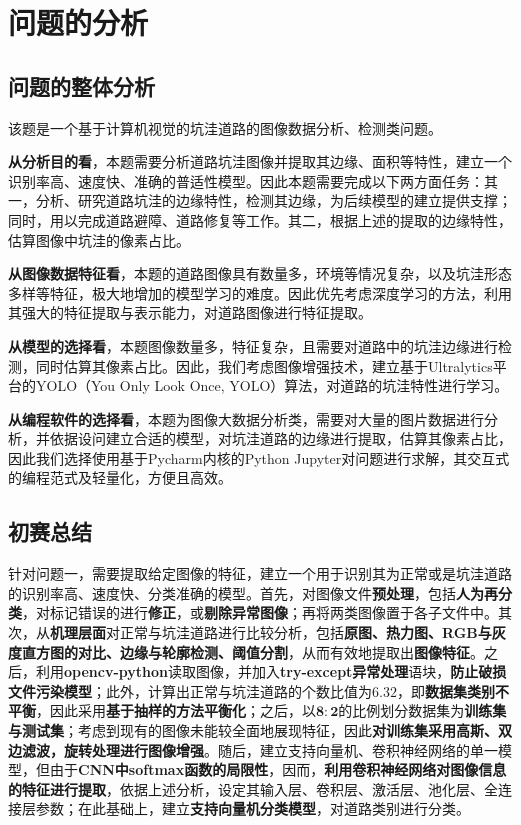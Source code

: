 \documentclass{MathorCupmodeling}
\begin{document}
	\section{问题的分析}
	\subsection{问题的整体分析}
	该题是一个基于计算机视觉的坑洼道路的图像数据分析、检测类问题。

	\textbf{从分析目的看}，本题需要分析道路坑洼图像并提取其边缘、面积等特性，建立一个识别率高、速度快、准确的普适性模型。因此本题需要完成以下两方面任务：{\heiti 其一}，分析、研究道路坑洼的边缘特性，检测其边缘，为后续模型的建立提供支撑；同时，用以完成道路避障、道路修复等工作。{\heiti 其二}，根据上述的提取的边缘特性，估算图像中坑洼的像素占比。

	\textbf{从图像数据特征看}，本题的道路图像具有数量多，环境等情况复杂，以及坑洼形态多样等特征，极大地增加的模型学习的难度。因此优先考虑深度学习的方法，利用其强大的特征提取与表示能力，对道路图像进行特征提取。

	\textbf{从模型的选择看}，本题图像数量多，特征复杂，且需要对道路中的坑洼边缘进行检测，同时估算其像素占比。因此，我们考虑图像增强技术，建立基于Ultralytics平台的YOLO（You Only Look Once, YOLO）算法，对道路的坑洼特性进行学习。

	\textbf{从编程软件的选择看}，本题为图像大数据分析类，需要对大量的图片数据进行分析，并依据设问建立合适的模型，对坑洼道路的边缘进行提取，估算其像素占比，因此我们选择使用基于Pycharm内核的Python Jupyter对问题进行求解，其交互式的编程范式及轻量化，方便且高效。
	\subsection{初赛总结}
		{\heiti 针对问题一}，需要提取给定图像的特征，建立一个用于识别其为正常或是坑洼道路的识别率高、速度快、分类准确的模型。首先，对图像文件\textbf{预处理}，包括\textbf{人为再分类}，对标记错误的进行\textbf{修正}，或\textbf{剔除异常图像}；再将两类图像置于各子文件中。其次，从\textbf{机理层面}对正常与坑洼道路进行比较分析，包括\textbf{原图、热力图、RGB与灰度直方图的对比、边缘与轮廓检测、阈值分割}，从而有效地提取出\textbf{图像特征}。之后，利用\textbf{opencv-python}读取图像，并加入\textbf{try-except异常处理}语块，\textbf{防止破损文件污染模型}；此外，计算出正常与坑洼道路的个数比值为$\boldsymbol{6.32}$，即\textbf{数据集类别不平衡}，因此采用\textbf{基于抽样的方法平衡化}；之后，以$\boldsymbol{8:2}$的比例划分数据集为\textbf{训练集与测试集}；考虑到现有的图像未能较全面地展现特征，因此\textbf{对训练集采用高斯、双边滤波，旋转处理进行图像增强}。随后，建立支持向量机、卷积神经网络的单一模型，但由于\textbf{CNN中softmax函数的局限性}，因而，\textbf{利用卷积神经网络对图像信息的特征进行提取}，依据上述分析，设定其输入层、卷积层、激活层、池化层、全连接层参数；在此基础上，建立\textbf{支持向量机分类模型}，对道路类别进行分类。
\end{document}
